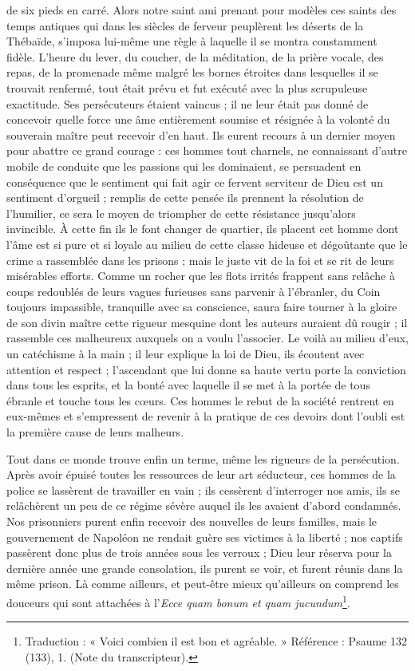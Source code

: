 de six pieds en carré. Alors notre saint ami prenant pour modèles ces saints des temps antiques qui dans les siècles de ferveur peuplèrent les déserts de la Thébaïde, s'imposa lui-même une règle à laquelle il se montra constamment fidèle. L'heure du lever, du coucher, de la méditation, de la prière vocale, des repas, de la promenade même malgré les bornes étroites dans lesquelles il se trouvait renfermé, tout était prévu et fut exécuté avec la plus scrupuleuse exactitude. Ses persécuteurs étaient vaincus ; il ne leur était pas donné de concevoir quelle force une âme entièrement soumise et résignée à la volonté du souverain maître peut recevoir d'en haut. Ils eurent recours à un dernier moyen pour abattre ce grand courage : ces hommes tout charnels, ne connaissant d'autre mobile de conduite que les passions qui les dominaient, se persuadent en conséquence que le sentiment qui fait agir ce fervent serviteur de Dieu est un sentiment d'orgueil ; remplis de cette pensée ils prennent la résolution de l'humilier, ce sera le moyen de triompher de cette résistance jusqu'alors invincible. À cette fin ils le font changer de quartier, ils placent cet homme dont l'âme est si pure et si loyale au milieu de cette classe hideuse et dégoûtante que le crime a rassemblée dans les prisons ; mais le juste vit de la foi et se rit de leurs misérables efforts. Comme un rocher que les flots irrités frappent sans relâche à coups redoublés de leurs vagues furieuses sans parvenir à l'ébranler, du Coin toujours impassible, tranquille avec sa conscience, saura faire tourner à la gloire de son divin maître cette rigueur mesquine dont les auteurs auraient dû rougir ; il rassemble ces malheureux auxquels on a voulu l'associer. Le voilà au milieu d'eux, un catéchisme à la main ; il leur explique la loi de Dieu, ils écoutent avec attention et respect ; l'ascendant que lui donne sa
haute vertu porte la conviction dans tous les esprits, et la bonté avec laquelle il se met à la portée de tous ébranle et touche tous les cœurs. Ces hommes le rebut de la société rentrent en eux-mêmes et s'empressent de revenir à la pratique de ces devoirs dont l'oubli est la première cause de leurs malheurs.

Tout dans ce monde trouve enfin un terme, même les rigueurs de la persécution. Après avoir épuisé toutes les ressources de leur art séducteur, ces hommes de la police se lassèrent de travailler en vain ; ils cessèrent d'interroger nos amis, ils se relâchèrent un peu de ce régime sévère auquel ils les avaient d'abord condamnés. Nos prisonniers purent enfin recevoir des nouvelles de leurs familles, mais le gouvernement de Napoléon ne rendait guère ses victimes à la liberté ; nos captifs passèrent donc plus de trois années sous les verroux ; Dieu leur réserva pour la dernière année une grande consolation, ils purent se voir, et furent réunis dans la même prison. Là comme ailleurs, et peut-être mieux qu'ailleurs on comprend les douceurs qui sont attachées à l'\textit{Ecce quam bonum et quam jucundum}\footnote{Traduction : « Voici combien il est bon et agréable. » Référence : Psaume 132 (133), 1. (Note du transcripteur).}.

